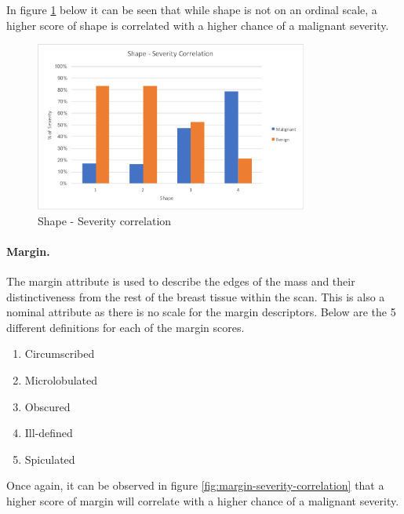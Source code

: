 \documentclass[12pt]{article}
\begin{document}
      In figure \ref{fig:shape-severity-correlation} below it can be seen that while shape is not on an ordinal scale, a higher score of shape is correlated with a higher chance of a malignant severity.

      \begin{figure}[H]
        \centering
        \includegraphics[width=0.8\textwidth]{shape-severity-correlation}
        \caption{Shape - Severity correlation}
        \label{fig:shape-severity-correlation}
      \end{figure}

    \paragraph{Margin.}
      The margin attribute is used to describe the edges of the mass and their distinctiveness from the rest of the breast tissue within the scan. This is also a nominal attribute as there is no scale for the margin descriptors. Below are the 5 different definitions for each of the margin scores.

      \singlespacing
      \begin{enumerate}[label=\arabic*)]
        \item Circumscribed
        \item Microlobulated
        \item Obscured
        \item Ill-defined
        \item Spiculated
      \end{enumerate}
      \doublespacing

      Once again, it can be observed in figure \ref{fig:margin-severity-correlation} that a higher score of margin will correlate with a higher chance of a malignant severity.
\end{document}
